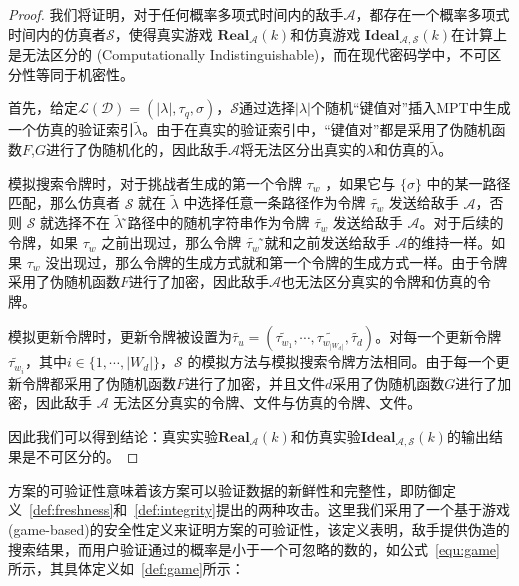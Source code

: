 \begin{proof}
  我们将证明，对于任何概率多项式时间内的敌手$\mathcal{A}$，都存在一个概率多项式时间内的仿真者$\mathcal{S}$，使得真实游戏 $\mathbf{Real}_\mathcal{A}(k)$和仿真游戏 $\mathbf{Ideal}_\mathcal{A,S}(k)$在计算上是无法区分的 (Computationally Indistinguishable)，而在现代密码学中，不可区分性等同于机密性。

  首先，给定$\mathcal{L}(\mathcal{D})=(|\lambda|,{\tau}_q,{\sigma})$，$\mathcal{S}$通过选择$|\lambda|$个随机“键值对”插入MPT中生成一个仿真的验证索引$\tilde{\lambda}$。由于在真实的验证索引中，“键值对”都是采用了伪随机函数$F$,$G$进行了伪随机化的，因此敌手$\mathcal{A}$将无法区分出真实的$\lambda$和仿真的$\tilde{\lambda}$。

  模拟搜索令牌时，对于挑战者生成的第一个令牌 $\tau_w$ ，如果它与 $\{\sigma\}$ 中的某一路径匹配，那么仿真者 $\mathcal{S}$ 就在 $\tilde{\lambda}$ 中选择任意一条路径作为令牌 $\tilde{\tau_w}$ 发送给敌手 $\mathcal{A}$，否则 $\mathcal{S}$ 就选择不在 $\tilde{\lambda}$ ̃路径中的随机字符串作为令牌 $\tilde{\tau_w}$ 发送给敌手 $\mathcal{A}$。对于后续的令牌，如果 $\tau_w$ 之前出现过，那么令牌 $\tilde{\tau_w}$ ̃就和之前发送给敌手 $\mathcal{A}$的维持一样。如果 $\tau_w$ 没出现过，那么令牌的生成方式就和第一个令牌的生成方式一样。由于令牌采用了伪随机函数$F$进行了加密，因此敌手$\mathcal{A}$也无法区分真实的令牌和仿真的令牌。

  模拟更新令牌时，更新令牌被设置为$\tilde{\tau_u} = (\tilde{\tau_{w_1}},\cdots,\tilde{\tau_{w_{|W_d|}}},\tilde{\tau_d})$。对每一个更新令牌$\tilde{\tau_{w_i}}$，其中$i \in \{1,\cdots, |W_d|\}$，$\mathcal{S}$ 的模拟方法与模拟搜索令牌方法相同。由于每一个更新令牌都采用了伪随机函数$F$进行了加密，并且文件$d$采用了伪随机函数$G$进行了加密，因此敌手 $\mathcal{A}$ 无法区分真实的令牌、文件与仿真的令牌、文件。

  因此我们可以得到结论：真实实验$\mathbf{Real}_\mathcal{A}(k)$和仿真实验$\mathbf{Ideal}_\mathcal{A,S}(k)$的输出结果是不可区分的。
\end{proof}

\single 方案的可验证性意味着该方案可以验证数据的新鲜性和完整性，即防御定义~\ref{def:freshness}和~\ref{def:integrity}提出的两种攻击。这里我们采用了一个基于游戏 (game-based)的安全性定义来证明\single 方案的可验证性，该定义表明，敌手提供伪造的搜索结果，而用户验证通过的概率是小于一个可忽略的数的，如公式~\ref{equ:game}所示，其具体定义如~\ref{def:game}所示：

